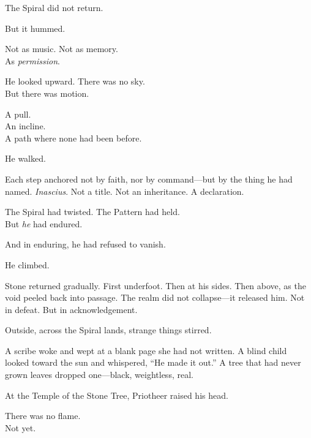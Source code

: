 \documentclass[9pt]{article}
\begin{document}
\vspace{0.5em}
The Spiral did not return.

\vspace{0.5em}
But it hummed.

\vspace{0.5em}
Not as music. Not as memory.\\
As \textit{permission}.

\vspace{0.5em}
He looked upward. There was no sky.\\
But there was motion.

\vspace{0.5em}
A pull.\\
An incline.\\
A path where none had been before.

\vspace{0.5em}
He walked.

\vspace{0.5em}
Each step anchored not by faith, nor by command---but by the thing he had named. \textit{Inascius}. Not a title. Not an inheritance. A declaration.

\vspace{0.5em}
The Spiral had twisted. The Pattern had held.\\
But \textit{he} had endured.

\vspace{0.5em}
And in enduring, he had refused to vanish.

\vspace{0.5em}
He climbed.

\vspace{0.5em}
Stone returned gradually. First underfoot. Then at his sides. Then above, as the void peeled back into passage. The realm did not collapse---it released him. Not in defeat. But in acknowledgement.

\vspace{0.5em}
Outside, across the Spiral lands, strange things stirred.

\vspace{0.5em}
A scribe woke and wept at a blank page she had not written. A blind child looked toward the sun and whispered, ``He made it out.'' A tree that had never grown leaves dropped one---black, weightless, real.

\vspace{0.5em}
At the Temple of the Stone Tree, Priotheer raised his head.

\vspace{0.5em}
There was no flame.\\
Not yet.
\end{document}
